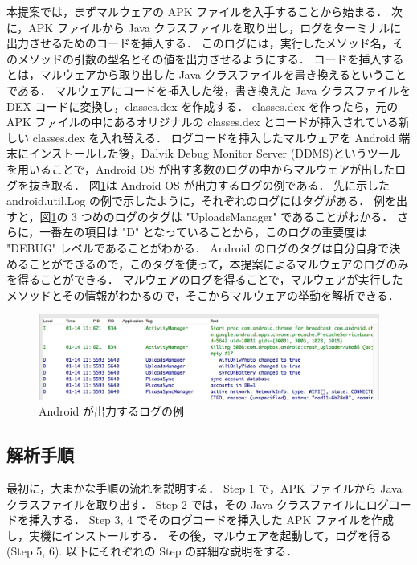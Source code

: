 本提案では，まずマルウェアの APK ファイルを入手することから始まる．
次に，APK ファイルから Java クラスファイルを取り出し，ログをターミナルに出力させるためのコードを挿入する．
このログには，実行したメソッド名，そのメソッドの引数の型名とその値を出力させるようにする．
コードを挿入するとは，マルウェアから取り出した Java クラスファイルを書き換えるということである．
マルウェアにコードを挿入した後，書き換えた Java クラスファイルを DEX コードに変換し，classes.dex を作成する．
classes.dex を作ったら，元の APK ファイルの中にあるオリジナルの classes.dex とコードが挿入されている新しい classes.dex を入れ替える．
ログコードを挿入したマルウェアを Android 端末にインストールした後，Dalvik Debug Monitor Server (DDMS)というツールを用いることで，Android OS が出す多数のログの中からマルウェアが出したログを抜き取る．
図\ref{examplelog}は Android OS が出力するログの例である．
先に示した android.util.Log の例で示したように，それぞれのログにはタグがある．
例を出すと，図\ref{examplelog}の 3 つめのログのタグは "UploadsManager" であることがわかる．
さらに，一番左の項目は "D"  となっていることから，このログの重要度は "DEBUG" レベルであることがわかる．
Android のログのタグは自分自身で決めることができるので，このタグを使って，本提案によるマルウェアのログのみを得ることができる．
マルウェアのログを得ることで，マルウェアが実行したメソッドとその情報がわかるので，そこからマルウェアの挙動を解析できる．

\begin{figure}[t]
\begin{center}
\includegraphics[scale=0.2]{androidlogexample.eps}
\end{center}
\caption{Android が出力するログの例}
\label{examplelog}
\end{figure}

\subsection{解析手順}
\label{analysismethod}
最初に，大まかな手順の流れを説明する．
Step 1 で，APK ファイルから Java クラスファイルを取り出す．
 Step 2 では，その Java クラスファイルにログコードを挿入する．
 Step 3, 4  でそのログコードを挿入した APK ファイルを作成し，実機にインストールする．
 その後，マルウェアを起動して，ログを得る (Step 5, 6). 
 以下にそれぞれの Step の詳細な説明をする．

